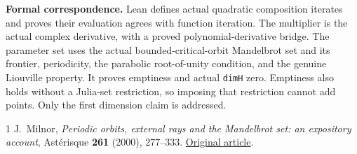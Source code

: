 \documentclass[11pt]{article}
\begin{document}
\noindent\textbf{Formal correspondence.} Lean defines actual quadratic composition iterates and proves their evaluation agrees with function iteration. The multiplier is the actual complex derivative, with a proved polynomial-derivative bridge. The parameter set uses the actual bounded-critical-orbit Mandelbrot set and its frontier, periodicity, the parabolic root-of-unity condition, and the genuine Liouville property. It proves emptiness and actual \texttt{dimH} zero. Emptiness also holds without a Julia-set restriction, so imposing that restriction cannot add points. Only the first dimension claim is addressed.

\begin{thebibliography}{1}
 J.~Milnor, \emph{Periodic orbits, external rays and the Mandelbrot set: an expository account}, Ast\'erisque \textbf{261} (2000), 277--333. \href{https://www.math.stonybrook.edu/files/dynamics/orm.pdf}{Original article}.
\end{thebibliography}
\end{document}
